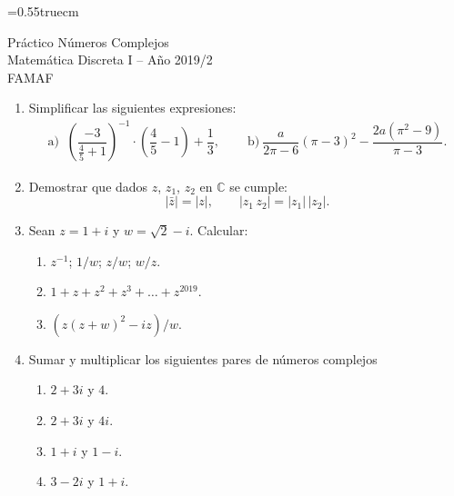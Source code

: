\documentclass[a4paper,12pt,twoside,spanish,reqno]{amsbook}
\numberwithin{equation}{section}
\newcommand \C{{\mathbb C}}
\begin{document}
    \baselineskip=0.55truecm %
    
    
    {\bf \begin{center} Práctico Números Complejos \\ Matemática Discreta I -- Año 2019/2 \\ FAMAF \end{center}}
    
    


\begin{enumerate}
\setlength\itemsep{1.1em}

\item
Simplificar las siguientes expresiones:
$$\begin{array}{ll}
 \text{a) } \ \left(\dfrac{-3}{\frac{4}{5}+1}\right)^{-1}\cdot\left(\dfrac{4}{5}-1\right) + \dfrac{1}{3}, \quad &
\text{ b)} \ \dfrac{a}{2\pi-6}(\pi-3)^2 -\dfrac{2a(\pi^2-9)}{\pi-3}.
\end{array}$$

\vspace{.5cm}


\item Demostrar que  dados $z$, $z_1$, $z_2$ en $\C$ se cumple:
\[ |\bar z|= |z|, \qquad |z_1 \, z_2|= |z_1| \, |z_2|. \]

\vspace{.5cm}


\item Sean $z=1+i$ y $w=\sqrt{2}-i$. Calcular:
 \begin{enumerate}
  \item $z^{-1}$; $1/w$; $z/w$; $w/z$.

  \item $1+z+z^2+z^3+\dots+z^{2019}$.

  \item $(z(z+w)^2-iz)/w$.
 \end{enumerate}


\vspace{.5cm}


\item Sumar y multiplicar los siguientes pares de números complejos
    \begin{enumerate}
        \item $2+ 3i$ y $4$.
        \item $2+ 3i$ y $4i$.
        \item $1 + i$ y $ 1 -i$.
        \item $3-2i$ y $1 +i$. 
    \end{enumerate}


\end{enumerate}
\end{document}
